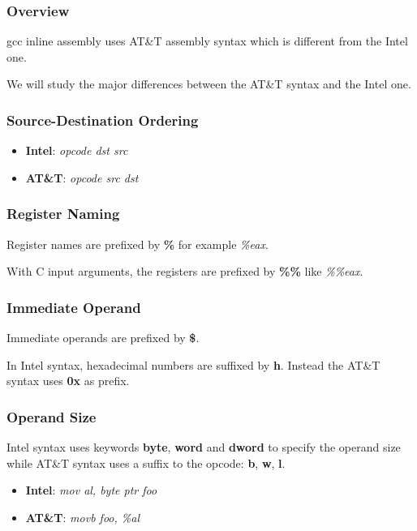 \documentclass[9pt]{beamer}
\newcommand{\nl}[0]{\vspace{0.4cm}}
\begin{document}
\begin{frame}
  \frametitle{Overview}

  gcc inline assembly uses AT\&T assembly syntax which is
  different from the Intel one.

  \nl

  We will study the major differences between the AT\&T syntax and the
  Intel one.
\end{frame}


\begin{frame}
  \frametitle{Source-Destination Ordering}

  \begin{itemize}
    \item
      \textbf{Intel}: \textit{opcode dst src}
    \item
      \textbf{AT\&T}: \textit{opcode src dst}
  \end{itemize}
\end{frame}


\begin{frame}
  \frametitle{Register Naming}

  Register names are prefixed by \textbf{\%} for example \textit{\%eax}.

  \nl

  With C input arguments, the registers are prefixed by \textbf{\%\%}
  like \textit{\%\%eax}.
\end{frame}


\begin{frame}
  \frametitle{Immediate Operand}

  Immediate operands are prefixed by \textbf{\$}.

  \nl

  In Intel syntax, hexadecimal numbers are suffixed by \textbf{h}.
  Instead the AT\&T syntax uses \textbf{0x} as prefix.
\end{frame}


\begin{frame}
  \frametitle{Operand Size}

  Intel syntax uses keywords \textbf{byte}, \textbf{word} and
  \textbf{dword} to specify the operand size while AT\&T syntax uses
  a suffix to the opcode: \textbf{b}, \textbf{w}, \textbf{l}.

  \begin{itemize}
    \item
      \textbf{Intel}: \textit{mov al, byte ptr foo}
    \item
      \textbf{AT\&T}: \textit{movb foo, \%al}
  \end{itemize}
\end{frame}
\end{document}
